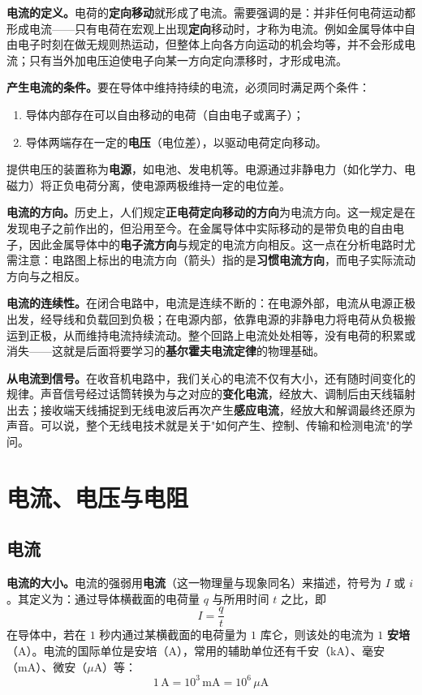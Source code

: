 \documentclass[12pt,UTF8]{ctexbook}
\begin{document}
\textbf{电流的定义。}电荷的\textbf{定向移动}就形成了电流。需要强调的是：并非任何电荷运动都形成电流——只有电荷在宏观上出现\textbf{定向}移动时，才称为电流。例如金属导体中自由电子时刻在做无规则热运动，但整体上向各方向运动的机会均等，并不会形成电流；只有当外加电压迫使电子向某一方向定向漂移时，才形成电流。

\textbf{产生电流的条件。}要在导体中维持持续的电流，必须同时满足两个条件：
\begin{enumerate}
  \item 导体内部存在可以自由移动的电荷（自由电子或离子）；
  \item 导体两端存在一定的\textbf{电压}（电位差），以驱动电荷定向移动。
\end{enumerate}

提供电压的装置称为\textbf{电源}，如电池、发电机等。电源通过非静电力（如化学力、电磁力）将正负电荷分离，使电源两极维持一定的电位差。

\textbf{电流的方向。}历史上，人们规定\textbf{正电荷定向移动的方向}为电流方向。这一规定是在发现电子之前作出的，但沿用至今。在金属导体中实际移动的是带负电的自由电子，因此金属导体中的\textbf{电子流方向}与规定的电流方向相反。这一点在分析电路时尤需注意：电路图上标出的电流方向（箭头）指的是\textbf{习惯电流方向}，而电子实际流动方向与之相反。


\textbf{电流的连续性。}在闭合电路中，电流是连续不断的：在电源外部，电流从电源正极出发，经导线和负载回到负极；在电源内部，依靠电源的非静电力将电荷从负极搬运到正极，从而维持电流持续流动。整个回路上电流处处相等，没有电荷的积累或消失——这就是后面将要学习的\textbf{基尔霍夫电流定律}的物理基础。

\textbf{从电流到信号。}在收音机电路中，我们关心的电流不仅有大小，还有随时间变化的规律。声音信号经过话筒转换为与之对应的\textbf{变化电流}，经放大、调制后由天线辐射出去；接收端天线捕捉到无线电波后再次产生\textbf{感应电流}，经放大和解调最终还原为声音。可以说，整个无线电技术就是关于"如何产生、控制、传输和检测电流"的学问。

\section{电流、电压与电阻}
\label{sec:current_voltage_resistance}

\subsection{电流}

\textbf{电流的大小。}电流的强弱用\textbf{电流}（这一物理量与现象同名）来描述，符号为 $I$ 或 $i$。其定义为：通过导体横截面的电荷量 $q$ 与所用时间 $t$ 之比，即
\[
I = \frac{q}{t}
\]
在导体中，若在 $1$ 秒内通过某横截面的电荷量为 $1$ 库仑，则该处的电流为 $1$ \textbf{安培}（A）。电流的国际单位是安培（A），常用的辅助单位还有千安（kA）、毫安（mA）、微安（$\mu$A）等：
\[
1\,\mathrm{A} = 10^{3}\,\mathrm{mA} = 10^{6}\,\mu\mathrm{A}
\]
\end{document}
